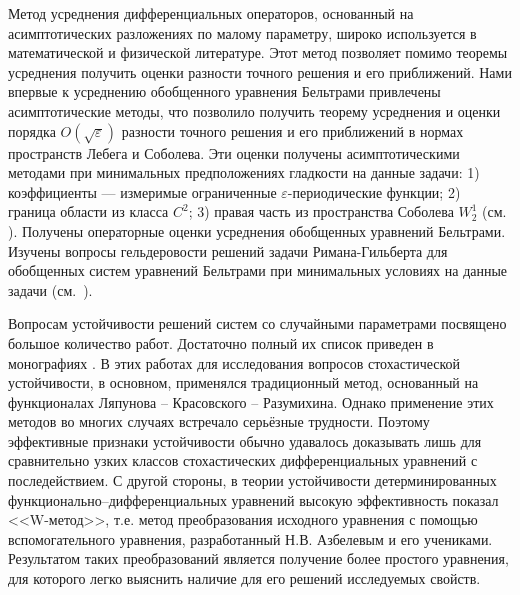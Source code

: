 \Introduction

Метод усреднения дифференциальных операторов, основанный на асимптотических
разложениях по малому параметру, широко используется  в математической и
физической литературе. Этот метод позволяет помимо теоремы усреднения
получить оценки разности точного решения и его приближений. Нами впервые
к усреднению обобщенного уравнения Бельтрами привлечены асимптотические
методы, что позволило получить теорему усреднения и оценки порядка
$O(\sqrt{\varepsilon})$  разности точного решения и его приближений
в нормах пространств Лебега и Соболева. Эти оценки получены
асимптотическими методами при минимальных предположениях гладкости
на данные задачи: 1) коэффициенты --- измеримые ограниченные
$\varepsilon$-периодические функции; 2) граница области из класса $C^2$; 3) правая часть из пространства Соболева $W_2^1$ (см. \cite{1, 2, 4}).
Получены операторные оценки усреднения обобщенных уравнений Бельтрами.
Изучены вопросы гельдеровости решений задачи Римана-Гильберта для
обобщенных систем уравнений Бельтрами при минимальных
условиях на данные задачи (см.\, \cite{3, 5, 6, 7, 8, 9, 10}).

Вопросам устойчивости решений систем со случайными параметрами
посвящено большое количество работ. Достаточно полный их список
приведен в монографиях \cite{kad1,kad2,kad3,kad4}. В этих работах для исследования
вопросов стохастической устойчивости, в основном, применялся
традиционный метод, основанный на функционалах
Ляпунова -- Красовского -- Разумихина. Однако применение этих методов во
многих случаях встречало серьёзные трудности. Поэтому эффективные
признаки устойчивости обычно удавалось доказывать лишь для
сравнительно узких классов стохастических дифференциальных уравнений
с последействием. С другой стороны, в теории устойчивости
детерминированных функционально--дифференциальных уравнений высокую
эффективность показал <<W-метод>>, т.е. метод преобразования
исходного уравнения с помощью вспомогательного уравнения,
разработанный Н.В. Азбелевым и его учениками. Результатом таких
преобразований является получение более простого уравнения, для
которого легко выяснить наличие для его решений исследуемых свойств.

